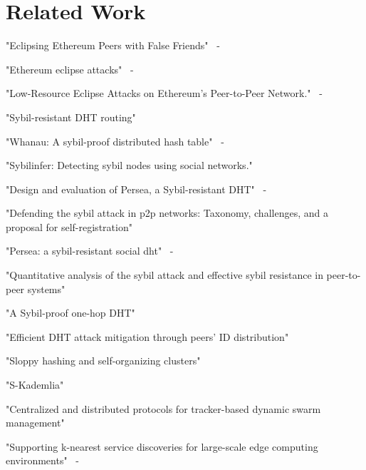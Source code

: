 \section{Related Work}
"Eclipsing Ethereum Peers with False Friends"~\cite{henningsen2019eclipsing} - 

"Ethereum eclipse attacks"~\cite{wust2016ethereum} - 

"Low-Resource Eclipse Attacks on Ethereum's Peer-to-Peer Network."~\cite{marcus2018low} - 

"Sybil-resistant DHT routing"~\cite{danezis2005sybil}

"Whanau: A sybil-proof distributed hash table"~\cite{lesniewski2010whanau} - 

"Sybilinfer: Detecting sybil nodes using social networks."~\cite{danezis2009sybilinfer}

"Design and evaluation of Persea, a Sybil-resistant DHT"~\cite{al2014design} - 

"Defending the sybil attack in p2p networks: Taxonomy, challenges, and a proposal for self-registration"~\cite{dinger2006defending}

"Persea: a sybil-resistant social dht"~\cite{al2013persea} - 

"Quantitative analysis of the sybil attack and effective sybil resistance in peer-to-peer systems"~\cite{jetter2010quantitative}

"A Sybil-proof one-hop DHT"~\cite{lesniewski2008sybil}

"Efficient DHT attack mitigation through peers' ID distribution"~\cite{cholez2010efficient}

"Sloppy hashing and self-organizing clusters"~\cite{freedman2003sloppy}

"S-Kademlia"~\cite{pecori2016s}

"Centralized and distributed protocols for tracker-based dynamic swarm management"~\cite{dan2012centralized}

"Supporting k-nearest service discoveries for large-scale edge computing environments"~\cite{teranishi2018supporting} - 

